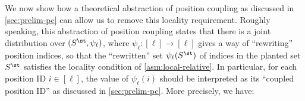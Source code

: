 \documentclass{article}
\newcommand{\arxiv}[1]{\iftoggle{icml}{}{#1}}
\newcommand{\icml}[1]{\iftoggle{icml}{#1}{}}
\begin{document}
We now show how a theoretical abstraction of position coupling as discussed in \cref{sec:prelim-pc} can allow us to remove this locality requirement.
Roughly speaking, this abstraction of position coupling states that there is a joint distribution over $(S^\st, \psi_\ell)$, where $\psi_\ell : [\ell]\to [\ell]$ gives a way of ``rewriting'' position indices, so that the ``rewritten'' set $\psi_\ell(S^\st)$ of indices in the planted set $S^\st$ satisfies the locality condition of \cref{asm:local-relative}. In particular, for each position ID $i \in [\ell]$, the value of $\psi_\ell(i)$ should be interpreted as its ``coupled position ID'' as discussed in \cref{sec:prelim-pc}. %
More precisely, we have\icml{ (see \cref{sec:appendix-pc} for the full definition)}: %
\icml{
\begin{definition}[Informal version of \cref{def:amenability}]
  \label{def:amenability-informal}
  Fix a distribution ensemble $\MP$  with $k$-sparse planted correlations per \cref{def:sparse-planted} (defined by $\mu, \Qpos, \Qvoc$). A \emph{$\Llocal$-local position coupling} of $\MP$ is defined by,  for each $\ell \in \BN$, %
  a joint distribution $\Qposc$ over tuples $(S^\st, \psi_\ell)$ with $S^\st \in \Sets{[\ell]}{k}$ and $\psi_{\ell} : [\ell] \to [\ell]$ so that the marginal of $S^\st$ under $\Qposc$ is $ \Qpos_\ell$ %
  and with probability 1 under the draw of $(S^\st, \psi_\ell) \sim \Qposc$: %
 \begin{enumerate}\icml{[itemsep=0.0em,topsep=0.0em,leftmargin=0.35cm,rightmargin=0cm]}
 \item \label{it:local-coupling} $\max\{ \psi_\ell(S^\st) \} - \min \{ \psi_\ell(S^\st)\} \leq \Llocal$. %
 \item $\psi_\ell, S^\st$ satisfy some additional \arxiv{technical} conditions which, e.g., prevent coupling of non-planted tokens (i.e., outside of $S^\st$; %
\cref{def:amenability}). 
 \end{enumerate}
\end{definition}
}
\arxiv{}
\end{document}
